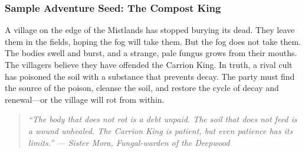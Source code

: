 \subsubsection*{Sample Adventure Seed: The Compost King}

A village on the edge of the Mistlands has stopped burying its dead. They leave them in the fields, hoping the fog will take them. But the fog does not take them. The bodies swell and burst, and a strange, pale fungus grows from their mouths. The villagers believe they have offended the Carrion King. In truth, a rival cult has poisoned the soil with a substance that prevents decay. The party must find the source of the poison, cleanse the soil, and restore the cycle of decay and renewal---or the village will rot from within.

\begin{quote}
\itshape
``The body that does not rot is a debt unpaid. The soil that does not feed is a wound unhealed. The Carrion King is patient, but even patience has its limits.''
\vspace{0.2cm}
--- Sister Mora, Fungal-warden of the Deepwood
\end{quote}